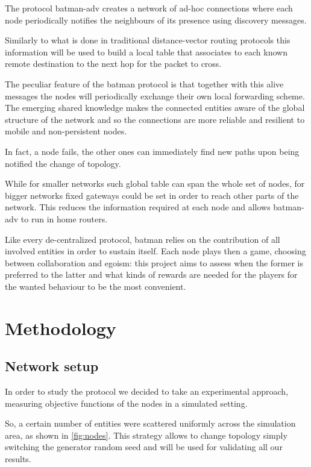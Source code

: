 \documentclass[conference]{IEEEtran}
\begin{document}
\smallskip

The protocol \gls{batman}-adv creates a network of ad-hoc connections where each
node periodically notifies the neighbours of its presence using discovery
messages.

Similarly to what is done in traditional distance-vector routing protocols this
information will be used to build a local table that associates to each known
remote destination to the next hop for the packet to cross.

The peculiar feature of the \gls{batman} protocol is that together with this
alive messages the nodes will periodically exchange their own local forwarding
scheme. The emerging shared knowledge makes the connected entities aware of the
global structure of the network and so the connections are more reliable and
resilient to mobile and non-persistent nodes.

In fact, a node fails, the other ones can immediately find new paths upon being
notified the change of topology.

While for smaller networks such global table can span the whole set of nodes,
for bigger networks fixed gateways could be set in order to reach other parts of
the network. This reduces the information required at each node and allows
\gls{batman}-adv to run in home routers.

\smallskip

Like every de-centralized protocol, \gls{batman} relies on the contribution of
all involved entities in order to sustain itself. Each node plays then a game,
choosing between collaboration and egoism: this project aims to assess when the
former is preferred to the latter and what kinds of rewards are needed for the
players for the wanted behaviour to be the most convenient.

\section{Methodology}

\subsection{Network setup}

In order to study the protocol we decided to take an experimental approach, measuring objective functions of the nodes in a simulated setting.

So, a certain number of entities were scattered uniformly across the simulation
area, as shown in \autoref{fig:nodes}. This strategy allows to change topology
simply switching the generator random seed and will be used for validating all our results.
\end{document}
